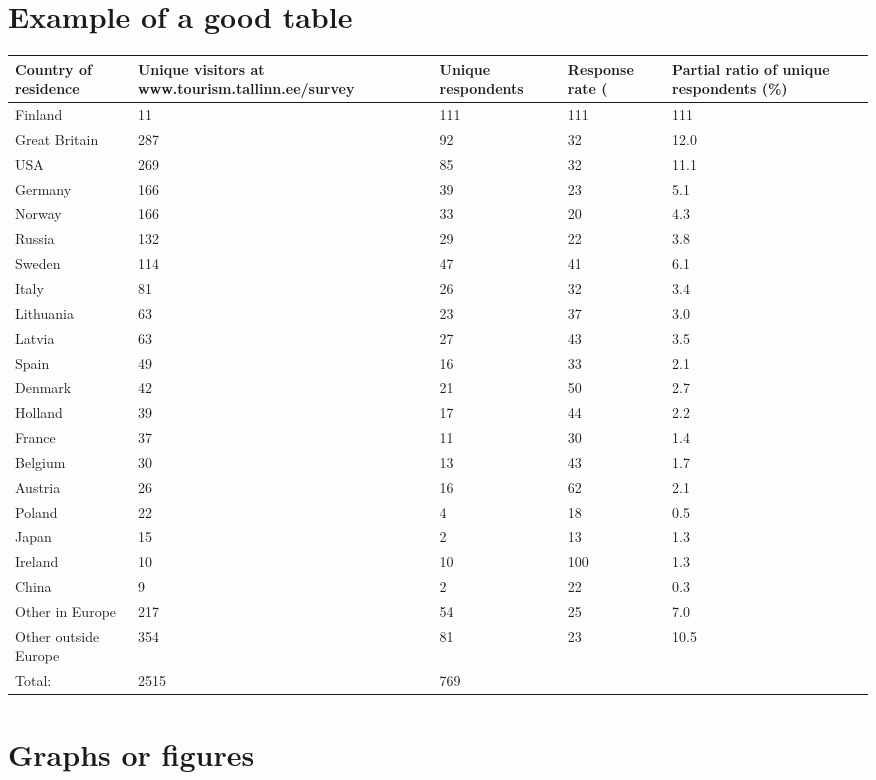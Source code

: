 \section{Example of a good table}
\label{sec:tableexample}


\begin{tabular}{|p{3cm}|p{3cm}|p{3cm}|p{3cm}|p{3cm}|}
	\hline 
	Country of residence & Unique visitors at www.tourism.tallinn.ee/survey & Unique respondents
	& Response rate (%
	& Partial ratio of unique respondents (\%) \\
    \hline	 
	Finland & 11 & 111 & 111 & 111 \\
	\hline
	Great Britain & 287 & 92 & 32 & 12.0\\
	\hline
	USA & 269 & 85 & 32 & 11.1\\
	\hline
	Germany & 166 &	39 & 23 & 5.1\\
	\hline
	Norway & 166 & 33 & 20 & 4.3\\
	\hline
	Russia & 132 & 29 & 22 & 3.8\\
	\hline
	Sweden & 114 & 47 & 41 & 6.1\\
	\hline
	Italy & 81 & 26 & 32 & 3.4\\
	\hline
	Lithuania & 63 & 23 & 37 & 3.0\\
	\hline
	Latvia & 63 & 27 & 43 & 3.5\\
	\hline
	Spain & 49 & 16 & 33 & 2.1\\
	\hline
	Denmark & 42 & 21 & 50 & 2.7\\
	\hline
	Holland & 39 & 17 & 44 & 2.2\\
	\hline
	France & 37 & 11 & 30 & 1.4\\
	\hline
	Belgium & 30 & 13 & 43 & 1.7\\
	\hline
	Austria & 26 & 16 & 62 & 2.1\\
	\hline
	Poland  & 22 & 4 & 18 & 0.5\\
	\hline
	Japan & 15 & 2 &	13 & 1.3\\
	\hline
	Ireland & 10 & 10 & 100 & 1.3\\
	\hline
	China  & 9 & 2 & 22 & 0.3\\
	\hline
	Other in Europe & 217 & 54 & 25 & 7.0\\
	\hline
	Other outside Europe & 354 & 81 & 23 & 10.5\\
	\hline\hline
	Total: & 2515 & 769  &   &  \\
	\hline 
\end{tabular} 
	
\section{Graphs or figures}
\label{sec:figureexample}

